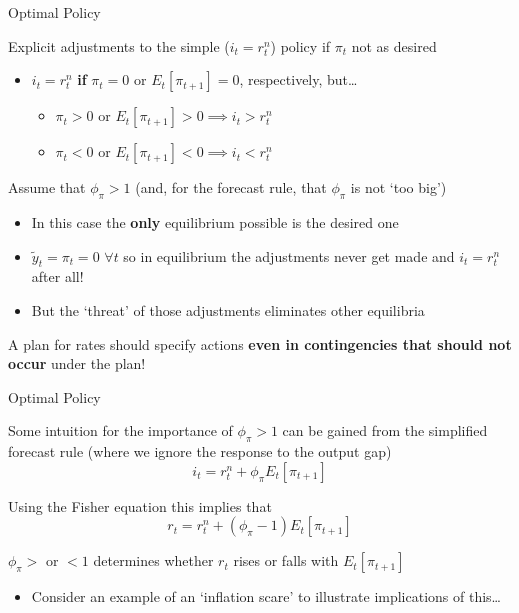 \begin{frame}{Optimal Policy}

Explicit adjustments to the simple ($i_{t} = r^{n}_{t}$) policy if $\pi_{t}$ not as desired
\begin{itemize}
\item	$i_{t}=r^{n}_{t}$ \textbf{if} $\pi_{t}=0$ or $E_{t}[\pi_{t+1}]=0$, respectively, but\ldots
	\begin{itemize}
	\item	$\pi_{t}>0$ or $E_{t}[\pi_{t+1}]>0 \implies i_{t}>r^{n}_{t}$
	\item	$\pi_{t}<0$ or $E_{t}[\pi_{t+1}]<0 \implies i_{t}<r^{n}_{t}$
	\end{itemize}
\end{itemize}

\vspace{2mm}
Assume that $\phi_{\pi}>1$ (and, for the forecast rule, that $\phi_{\pi}$ is not `too big') 
\begin{itemize}
\item	In this case the \textbf{only} equilibrium possible is the desired one
\item	$\tilde{y}_{t}=\pi_{t}=0$ $\forall t$ so in equilibrium the adjustments never get made and $i_{t}=r^{n}_{t}$ after all!
\item	But the `threat' of those adjustments eliminates other equilibria
\end{itemize}

\vspace{2mm}
A plan for rates should specify actions \textbf{even in contingencies that should not occur} under the plan!

\end{frame}


	
\begin{frame}{Optimal Policy}

Some intuition for the importance of $\phi_{\pi}>1$ can be gained from the simplified forecast rule (where we ignore the response to the output gap)
\[
i_{t} = r^{n}_{t} + \phi_{\pi} E_{t}[ \pi_{t+1} ]
\]

\vspace{3mm}
Using the Fisher equation this implies that
\[
r_{t} = r^{n}_{t} + (\phi_{\pi}-1) E_{t}[ \pi_{t+1} ]
\]

\vspace{3mm}
$\phi_{\pi} >$ or $<1$ determines whether $r_{t}$ rises or falls with $E_{t}[\pi_{t+1}]$
\begin{itemize}
\item	Consider an example of an `inflation scare' to illustrate implications of this\ldots
\end{itemize}

\end{frame}

